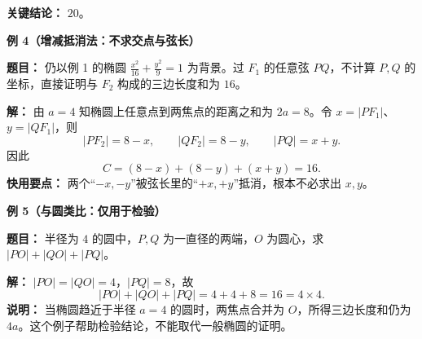 \begin{examplebox}
	\textbf{\textcolor{CExample}{关键结论：}} \textbf{$20$}。


\medskip
\textbf{\textcolor{CExample}{例 4（增减抵消法：不求交点与弦长）}}

\textbf{题目：} 仍以例 1 的椭圆 $\frac{x^2}{16}+\frac{y^2}{9}=1$ 为背景。过 $F_1$ 的任意弦 $PQ$，不计算 $P,Q$ 的坐标，直接证明与 $F_2$ 构成的三边长度和为 $16$。

\textbf{解：} 由 $a=4$ 知椭圆上任意点到两焦点的距离之和为 $2a=8$。令 $x=|PF_1|$、$y=|QF_1|$，则
\[
 |PF_2|=8-x,\qquad |QF_2|=8-y,\qquad |PQ|=x+y.
\]
因此
\[
 C=(8-x)+(8-y)+(x+y)=\boxed{16}.
\]
\textbf{快用要点：} 两个“$-x,-y$”被弦长里的“$+x,+y$”抵消，根本不必求出 $x,y$。

\medskip
\textbf{\textcolor{CExample}{例 5（与圆类比：仅用于检验）}}

\textbf{题目：} 半径为 $4$ 的圆中，$P,Q$ 为一直径的两端，$O$ 为圆心，求 $|PO|+|QO|+|PQ|$。

\textbf{解：} $|PO|=|QO|=4$，$|PQ|=8$，故
\[
 |PO|+|QO|+|PQ|=4+4+8=\boxed{16}=4\times 4.
\]
\textbf{说明：} 当椭圆趋近于半径 $a=4$ 的圆时，两焦点合并为 $O$，所得三边长度和仍为 $4a$。这个例子帮助检验结论，不能取代一般椭圆的证明。
\end{examplebox}